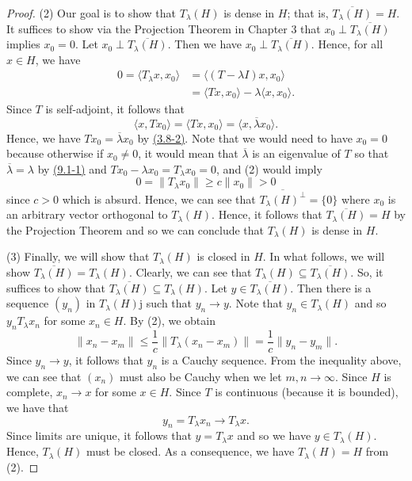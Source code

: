 \begin{proof}
    (2) Our goal is to show that \( {T}_{\lambda}(H) \) is dense in \( H  \); that is, \( \overline{{T}_{\lambda}(H)} = H  \). It suffices to show via the Projection Theorem in Chapter 3 that \( {x}_{0} \perp \overline{{T}_{\lambda}(H)} \) implies \( {x}_{0} = 0  \). Let \( {x}_{0} \perp \overline{{T}_{\lambda}(H)} \). Then we have \( {x}_{0} \perp \overline{{T}_{\lambda}(H)} \). Hence, for all \( x \in H  \), we have 
    \begin{align*}
        0 = \langle {T}_{\lambda}x  , {x}_{0} \rangle &= \langle (T - \lambda I)x , {x}_{0}  \rangle \\
                                                      &= \langle Tx  , {x}_{0} \rangle - \lambda \langle x  , {x}_{0} \rangle.
\end{align*}
Since \( T  \) is self-adjoint, it follows that 
\[  \langle x , T {x}_{0} \rangle = \langle Tx  , {x}_{0} \rangle = \langle x , \overline{\lambda} {x}_{0} \rangle. \]
Hence, we have \( T {x}_{0} = \overline{\lambda} {x}_{0} \) by {\hyperref[(3.8-2)]{(3.8-2)}}. Note that we would need to have \( {x}_{0} = 0  \) because otherwise if \( {x}_{0} \neq 0  \), it would mean that \( \overline{\lambda}  \) is an eigenvalue of \( T  \) so that \( \overline{\lambda} = \lambda  \) by {\hyperref[(9.1-1)]{(9.1-1)}} and \( T {x}_{0} - \lambda {x}_{0} = {T}_{\lambda}{x}_{0} = 0  \), and (2) would imply  
\[  0 = \|{T}_{\lambda} {x}_{0} \| \geq c \|{x}_{0}\| >  0  \]
since \( c > 0  \) which is absurd. Hence, we can see that \( \overline{{T}_{\lambda}(H)^{\perp}} = \{ 0  \}   \) where \( {x}_{0} \) is an arbitrary vector orthogonal to \( {T}_{\lambda}(H) \). Hence, it follows that \( \overline{{T}_{\lambda}(H)} = H  \) by the Projection Theorem and so we can conclude that \( {T}_{\lambda}(H)  \) is dense in \( H  \).

(3) Finally, we will show that \( {T}_{\lambda}(H) \) is closed in \( H  \). In what follows, we will show \( \overline{{T}_{\lambda}(H)} = {T}_{\lambda}(H) \). Clearly, we can see that \( {T}_{\lambda}(H) \subseteq \overline{{T}_{\lambda}(H)} \). So, it suffices to show that \( \overline{{T}_{\lambda}(H)} \subseteq  {T}_{\lambda}(H) \). Let \( y \in \overline{{T}_{\lambda}(H)} \). Then there is a sequence \( (y_{n}) \) in \( {T}_{\lambda}(H) \)j such that \( {y}_{n} \to y \). Note that \( {y}_{n} \in {T}_{\lambda}(H) \) and so \( {y}_{n} {T}_{\lambda} {x}_{n} \) for some \( {x}_{n} \in H  \). By (2), we obtain 
\[ \|{x}_{n} - {x}_{m}\| \leq \frac{ 1 }{ c }  \|{T}_{\lambda}({x}_{n} - {x}_{m})\| = \frac{ 1 }{ c }  \|{y}_{n} - {y}_{m}\|.  \]
Since \( {y}_{n} \to y  \), it follows that \( {y}_{n} \) is a Cauchy sequence. From the inequality above, we can see that \( ({x}_{n}) \) must also be Cauchy when we let \( m,n \to \infty  \). Since \( H  \) is complete, \( {x}_{n} \to x  \) for some \( x \in H \). Since \( T  \) is continuous (because it is bounded), we have that 
\[  {y}_{n} = {T}_{\lambda}{x}_{n} \to {T}_{\lambda}x. \]
Since limits are unique, it follows that \( y = {T}_{\lambda}x \) and so we have \( y \in {T}_{\lambda}(H) \). Hence, \( {T}_{\lambda}(H) \) must be closed. As a consequence, we have \( {T}_{\lambda}(H) = H  \) from (2).


\end{proof}
